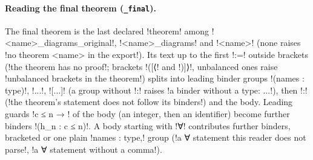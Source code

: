 {{{\paragraph{Reading the final theorem (\texttt{\_final}).} The final theorem is the last declared
\lexcode!theorem! among \lexcode!<name>_diagrams_original!, \lexcode!<name>_diagrams! and \lexcode!<name>!
(none raises \lexcode!no theorem <name> in the export!). Its text up to the first \lexcode!:=! outside
brackets (\lexcode!the theorem has no proof!; brackets \lexcode!([{⟨! and \lexcode!)]}⟩!, unbalanced ones
raise \lexcode!unbalanced brackets in the theorem!) splits into leading binder groups
\lexcode!(names : type)!, \lexcode!{...}!, \lexcode![...]! (a group without \lexcode!:! raises
\lexcode!a binder without a type: ...!), then \lexcode!:! (\lexcode!the theorem's statement does not follow its binders!) and the body. Leading guards \lexcode!c ≤ n → ! of the body (an integer, then an identifier) become further binders \lexcode!(h_n : c ≤ n)!. A body starting with \lexcode!∀! contributes further binders, bracketed or
one plain \lexcode!names : type,! group (\lexcode!a ∀ statement this reader does not parse!, \lexcode!a ∀ statement without a comma!).

}}}
